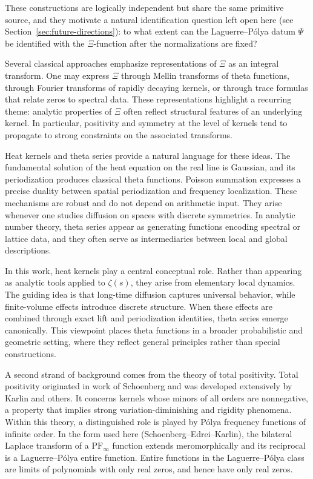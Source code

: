 \documentclass[12pt]{amsart}
\theoremstyle{definition}
\theoremstyle{remark}
\begin{document}
These constructions are logically independent but share the same primitive source, and they
motivate a natural identification question left open here (see
Section~\ref{sec:future-directions}): to what extent can the Laguerre--P\'olya datum $\Psi$
be identified with the $\Xi$-function after the normalizations are fixed?


Several classical approaches emphasize representations of $\Xi$ as an integral transform. One may express $\Xi$ through Mellin transforms of theta functions, through Fourier transforms of rapidly decaying kernels, or through trace formulas that relate zeros to spectral data\cite{Selberg1956,BerryKeating1999}. These representations highlight a recurring theme: analytic properties of $\Xi$ often reflect structural features of an underlying kernel. In particular, positivity and symmetry at the level of kernels tend to propagate to strong constraints on the associated transforms.

Heat kernels and theta series provide a natural language\cite{Chandrasekharan1985,SteinShakarchi2003} for these ideas. The fundamental solution of the heat equation on the real line is Gaussian, and its periodization produces classical theta functions. Poisson summation expresses a precise duality between spatial periodization and frequency localization. These mechanisms are robust and do not depend on arithmetic input. They arise whenever one studies diffusion on spaces with discrete symmetries. In analytic number theory, theta series appear as generating functions encoding spectral or lattice data, and they often serve as intermediaries between local and global descriptions.

In this work, heat kernels play a central conceptual role. Rather than appearing as analytic tools applied to $\zeta(s)$, they arise from elementary local dynamics. The guiding idea is that long-time diffusion captures universal behavior, while finite-volume effects introduce discrete structure. When these effects are combined through exact lift and periodization identities, theta series emerge canonically. This viewpoint places theta functions in a broader probabilistic and geometric setting, where they reflect general principles rather than special constructions.

A second strand of background comes from the theory of total positivity\cite{Pinkus2010,karlin1968total,GantmacherKrein2002}. Total positivity originated in work of Schoenberg and was developed extensively by Karlin and others. It concerns kernels whose minors of all orders are nonnegative, a property that implies strong variation-diminishing and rigidity phenomena. Within this theory, a distinguished role is played by P\'olya frequency functions of infinite order. In the form used here (Schoenberg--Edrei--Karlin), the bilateral Laplace transform of a $\mathrm{PF}_\infty$ function extends meromorphically and its reciprocal is a Laguerre--P\'olya entire function. Entire functions in the Laguerre--P\'olya class\cite{Levin1964,PolyaSchur1914} are limits of polynomials with only real zeros, and hence have only real zeros.
\end{document}
